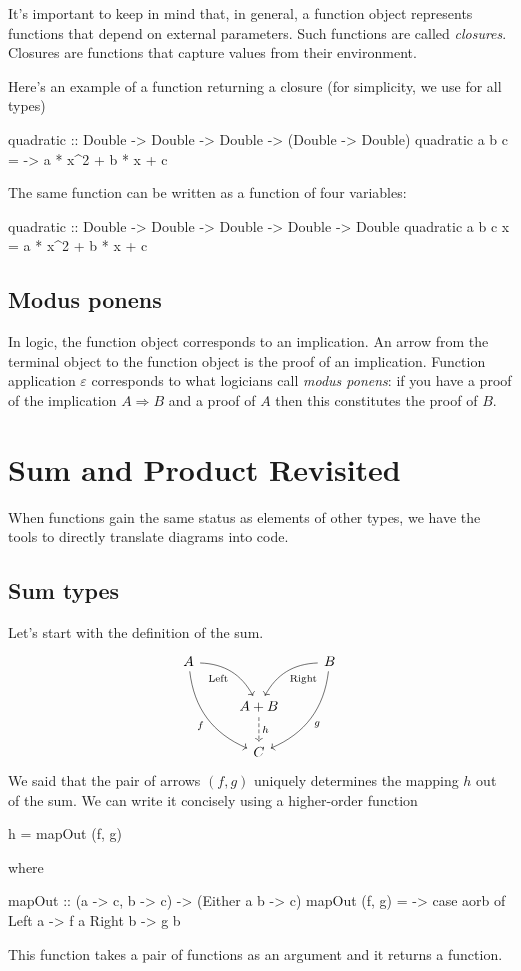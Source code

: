 \documentclass[DaoFP]{subfiles}
\begin{document}
It's important to keep in mind that, in general, a function object represents functions that depend on external parameters. Such functions are called \emph{closures}. Closures are functions that capture values from their environment.

Here's an example of a function returning a closure (for simplicity, we use  for all types)
\begin{haskell}
quadratic :: Double -> Double -> Double -> (Double -> Double)
quadratic a b c = \x -> a * x^2 + b * x + c
\end{haskell}
The same function can be written as a function of four variables:
\begin{haskell}
quadratic :: Double -> Double -> Double -> Double -> Double
quadratic a b c x = a * x^2 + b * x + c
\end{haskell}


\subsection{Modus ponens}

In logic, the function object corresponds to an implication. An arrow from the terminal object to the function object is the proof of an implication. Function application $\varepsilon$ corresponds to what logicians call \emph{modus ponens}: if you have a proof of the implication $A \Rightarrow B$ and a proof of $A$ then this constitutes the proof of $B$.

\section{Sum and Product Revisited}

When functions gain the same status as elements of other types, we have the tools to directly translate diagrams into code. 

\subsection{Sum types}

Let's start with the definition of the sum.
\[
 \begin{tikzcd}
 A
 \arrow[dr,  bend left, "\text{Left}"']
 \arrow[ddr, bend right, "f"']
 && B
 \arrow[dl, bend right, "\text{Right}"]
 \arrow[ddl, bend left, "g"]
 \\
&A + B
\arrow[d, dashed, "h"]
\\
& C
 \end{tikzcd}
\]
We said that the pair of arrows $(f, g)$ uniquely determines the mapping $h$ out of the sum. We can write it concisely using a higher-order function
\begin{haskell}
h = mapOut (f, g)
\end{haskell}
where
\begin{haskell}
mapOut :: (a -> c, b -> c) -> (Either a b -> c)
mapOut (f, g) = \aorb -> case aorb of
                         Left  a -> f a
                         Right b -> g b
\end{haskell}
This function takes a pair of functions as an argument and it returns a function. 
\end{document}
